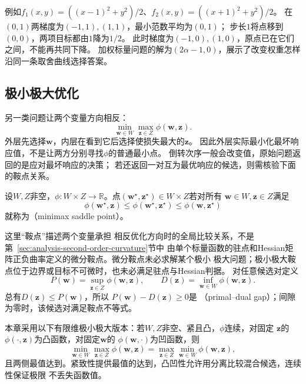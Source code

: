 例如$f_1(x,y)=((x-1)^2+y^2)/2$、$f_2(x,y)=((x+1)^2+y^2)/2$。
在$(0,1)$两梯度为$(-1,1),(1,1)$，最小范数平均为$(0,1)$；
步长$1$将点移到$(0,0)$，两项目标都由$1$降为$1/2$。
此时梯度为$(-1,0),(1,0)$，原点已在它们之间，不能再共同下降。
加权标量问题的解为$(2\alpha-1,0)$，展示了改变权重怎样沿同一条取舍曲线选择答案。

\subsection{极小极大优化}
\label{sec:opt-minimax}

另一类问题让两个变量方向相反：
\[
  \min_{\bm{w}\in W}\max_{\bm{z}\in Z}\phi(\bm{w},\bm{z}).
\]
外层先选择$\bm w$，内层在看到它后选择使损失最大的$\bm z$。
因此外层实际最小化最坏响应值，不是让两方分别寻找$\phi$的普通最小点。
倒转次序一般会改变值，原始问题返回的是应对最坏响应的决策；
若还返回一对互为最优响应的候选，则需核验下面的鞍点关系。
\begin{definition}[极小极大鞍点]
\label{def:opt-minimax-saddle}
设$W,Z$非空，$\phi:W\times Z\to\mathbb R$。点$(\bm w^\star,\bm z^\star)\in W\times Z$若对所有
$\bm w\in W,\bm z\in Z$满足
\[
  \phi(\bm{w}^{\star},\bm{z})
  \leq\phi(\bm{w}^{\star},\bm{z}^{\star})
  \leq\phi(\bm{w},\bm{z}^{\star})
\]
就称为（minimax saddle point）。
\end{definition}
这里“鞍点”描述两个变量承担
相反优化方向时的全局比较关系，不是第~\ref{sec:analysis-second-order-curvature}节中
由单个标量函数的驻点和Hessian矩阵正负曲率定义的微分鞍点。微分鞍点未必求解某个极小
极大问题；极小极大鞍点位于边界或目标不可微时，也未必满足驻点与Hessian判据。
对任意候选对定义
\[
  P(\bm{w})=\sup_{\bm{z}\in Z}\phi(\bm{w},\bm{z}),\qquad
  D(\bm{z})=\inf_{\bm{w}\in W}\phi(\bm{w},\bm{z}).
\]
总有$D(\bm{z})\leq P(\bm{w})$，所以
$P(\bm{w})-D(\bm{z})\geq0$是
（primal--dual gap）；间隙为零时，该候选对满足鞍点不等式。

本章采用以下有限维极小极大版本：若$W,Z$非空、紧且凸，$\phi$连续，对固定
$\bm{z}$的$\phi(\cdot,\bm{z})$为凸函数，对固定$\bm{w}$的
$\phi(\bm{w},\cdot)$为凹函数，则
\[
  \min_{\bm{w}\in W}\max_{\bm{z}\in Z}\phi(\bm{w},\bm{z})
  =
  \max_{\bm{z}\in Z}\min_{\bm{w}\in W}\phi(\bm{w},\bm{z}),
\]
且两侧最值达到。紧致性提供最值的达到，凸凹性允许用分离比较混合候选，连续性保证极限
不丢失函数值。

